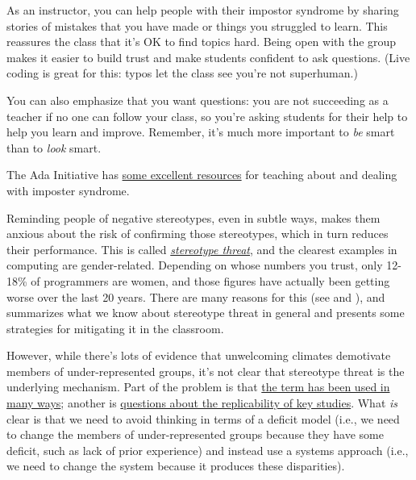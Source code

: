 As an instructor, you can help people with their impostor syndrome by
sharing stories of mistakes that you have made or things you struggled
to learn. This reassures the class that it's OK to find topics hard.
Being open with the group makes it easier to build trust and make
students confident to ask questions. (Live coding is great for this:
typos let the class see you're not superhuman.)

You can also emphasize that you want questions: you are not succeeding
as a teacher if no one can follow your class, so you're asking
students for their help to help you learn and improve. Remember, it's
much more important to \emph{be} smart than to \emph{look} smart.

The Ada Initiative has
\href{http://adainitiative.org/continue-our-work/impostor-syndrome-training/}{some
excellent resources} for teaching about and dealing with imposter
syndrome.


Reminding people of negative stereotypes, even in subtle ways, makes
them anxious about the risk of confirming those stereotypes, which in
turn reduces their performance. This is called
\emph{\href{https://en.wikipedia.org/wiki/Stereotype\_threat}{stereotype
threat}}, and the clearest examples in computing are gender-related.
Depending on whose numbers you trust, only 12-18\% of programmers are
women, and those figures have actually been getting worse over the
last 20 years. There are many reasons for this (see
\cite{bib:margolis-fisher-clubhouse} and \cite{bib:margolis-shallow}),
and \cite{bib:steele-vivaldi} summarizes what we know about stereotype
threat in general and presents some strategies for mitigating it in
the classroom.

However, while there's lots of evidence that unwelcoming climates
demotivate members of under-represented groups, it's not clear that
stereotype threat is the underlying mechanism. Part of the problem is
that
\href{http://www.europhd.net/html/\_onda02/07/PDF/20th\_lab\_materials/jane/shapiro\_neuberg\_2007.pdf}{the
term has been used in many ways}; another is
\href{https://www.psychologytoday.com/blog/rabble-rouser/201512/is-stereotype-threat-overcooked-overstated-and-oversold}{questions
about the replicability of key studies}. What \emph{is} clear is that we
need to avoid thinking in terms of a deficit model (i.e., we need to
change the members of under-represented groups because they have some
deficit, such as lack of prior experience) and instead use a systems
approach (i.e., we need to change the system because it produces these
disparities).


